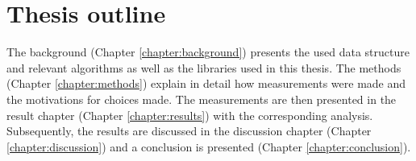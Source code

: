 \section{Thesis outline}
The background (Chapter \ref{chapter:background}) presents the used data structure and relevant algorithms as well as the libraries used in this thesis. The methods (Chapter \ref{chapter:methods}) explain in detail how measurements were made and the motivations for choices made. The measurements are then presented in the result chapter (Chapter \ref{chapter:results}) with the corresponding analysis. Subsequently, the results are discussed in the discussion chapter (Chapter \ref{chapter:discussion}) and a conclusion is presented  (Chapter \ref{chapter:conclusion}).
